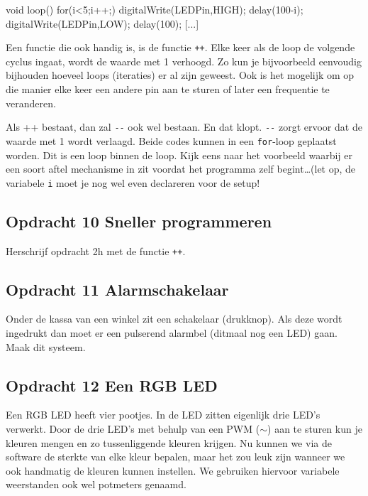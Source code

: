 \documentclass{arduino}
\begin{document}
\begin{marginlisting}
void loop(){
  for(i<5;i++;) {
    digitalWrite(LEDPin,HIGH);
    delay(100-i);
    digitalWrite(LEDPin,LOW);
    delay(100);
  }
  [...]
}
\end{marginlisting}
Een functie die ook handig is, is de functie \lstinline{++}. Elke keer als de loop de volgende cyclus ingaat, wordt de waarde met 1 verhoogd. Zo kun je bijvoorbeeld eenvoudig bijhouden hoeveel loops (iteraties) er al zijn geweest. Ook is het mogelijk om op die manier elke keer een andere pin aan te sturen of later een frequentie te veranderen.

Als ++ bestaat, dan zal \lstinline{--} ook wel bestaan. En dat klopt. \lstinline{--} zorgt ervoor dat de waarde met 1 wordt verlaagd. Beide codes kunnen in een \lstinline{for}-loop geplaatst worden. Dit is een loop binnen de loop. Kijk eens naar het voorbeeld waarbij er een soort aftel mechanisme in zit voordat het programma zelf begint\dots (let op, de variabele \lstinline{i} moet je nog wel even declareren voor de setup!

\subsection{Opdracht 10 Sneller programmeren}

Herschrijf opdracht 2h met de functie \lstinline{++}.

\subsection{Opdracht 11 Alarmschakelaar}

Onder de kassa van een winkel zit een schakelaar (drukknop). Als deze wordt ingedrukt dan moet er een pulserend alarmbel (ditmaal nog een LED) gaan. Maak dit systeem.

\newpage
\subsection{Opdracht 12 Een RGB LED}


Een RGB LED heeft vier pootjes. In de LED zitten eigenlijk drie LED’s verwerkt. Door de drie LED’s met behulp van een PWM ($\sim$) aan te sturen kun je kleuren mengen en zo tussenliggende kleuren krijgen. Nu kunnen we via de software de sterkte van elke kleur bepalen, maar het zou leuk zijn wanneer we ook handmatig de kleuren kunnen instellen. We gebruiken hiervoor variabele weerstanden ook wel potmeters genaamd.
\end{document}
